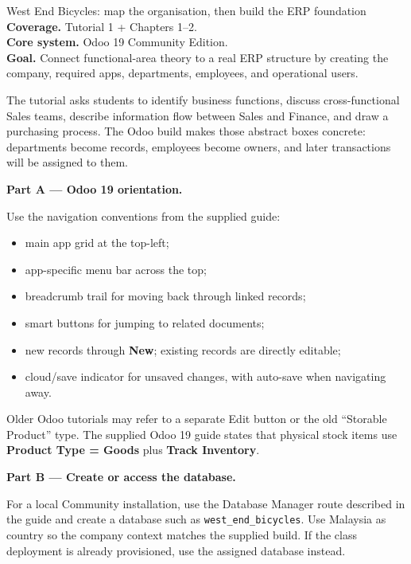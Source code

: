 
\begin{labproject}{West End Bicycles: map the organisation, then build the ERP foundation}
\textbf{Coverage.} Tutorial 1 + Chapters 1--2.\\
\textbf{Core system.} Odoo 19 Community Edition.\\
\textbf{Goal.} Connect functional-area theory to a real ERP structure by creating the company, required apps, departments, employees, and operational users.

\begin{labmode}
The tutorial asks students to identify business functions, discuss cross-functional Sales teams, describe information flow between Sales and Finance, and draw a purchasing process. The Odoo build makes those abstract boxes concrete: departments become records, employees become owners, and later transactions will be assigned to them.
\end{labmode}

\medskip\noindent\textbf{Part A --- Odoo 19 orientation.}

Use the navigation conventions from the supplied guide:
\begin{itemize}
  \item main app grid at the top-left;
  \item app-specific menu bar across the top;
  \item breadcrumb trail for moving back through linked records;
  \item smart buttons for jumping to related documents;
  \item new records through \textbf{New}; existing records are directly editable;
  \item cloud/save indicator for unsaved changes, with auto-save when navigating away.
\end{itemize}

\begin{pitfall}
Older Odoo tutorials may refer to a separate Edit button or the old ``Storable Product'' type. The supplied Odoo 19 guide states that physical stock items use \textbf{Product Type = Goods} plus \textbf{Track Inventory}.
\end{pitfall}

\medskip\noindent\textbf{Part B --- Create or access the database.}

For a local Community installation, use the Database Manager route described in the guide and create a database such as \texttt{west\_end\_bicycles}. Use Malaysia as country so the company context matches the supplied build. If the class deployment is already provisioned, use the assigned database instead.


\end{labproject}
